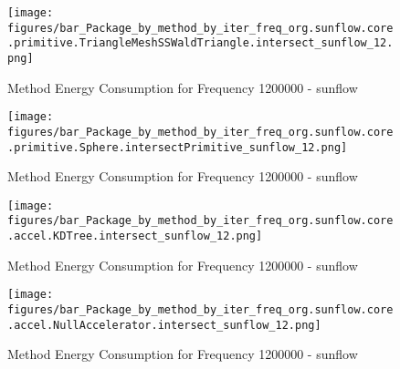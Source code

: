				\begin{figure}[H]
				\centering
				\texttt{[image: figures/bar\_Package\_by\_method\_by\_iter\_freq\_org.sunflow.core.primitive.TriangleMeshSSWaldTriangle.intersect\_sunflow\_12.png]}
				\caption{Method Energy Consumption for Frequency 1200000 - sunflow}				
				\end{figure}				
				
				\begin{figure}[H]
				\centering
				\texttt{[image: figures/bar\_Package\_by\_method\_by\_iter\_freq\_org.sunflow.core.primitive.Sphere.intersectPrimitive\_sunflow\_12.png]}
				\caption{Method Energy Consumption for Frequency 1200000 - sunflow}				
				\end{figure}				
				
				\begin{figure}[H]
				\centering
				\texttt{[image: figures/bar\_Package\_by\_method\_by\_iter\_freq\_org.sunflow.core.accel.KDTree.intersect\_sunflow\_12.png]}
				\caption{Method Energy Consumption for Frequency 1200000 - sunflow}				
				\end{figure}				
				
				\begin{figure}[H]
				\centering
				\texttt{[image: figures/bar\_Package\_by\_method\_by\_iter\_freq\_org.sunflow.core.accel.NullAccelerator.intersect\_sunflow\_12.png]}
				\caption{Method Energy Consumption for Frequency 1200000 - sunflow}				
				\end{figure}				
				